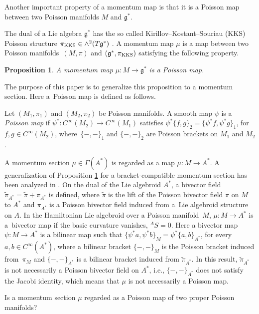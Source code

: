 \documentclass[pdftex]{sigma}
\numberwithin{equation}{section}
\newtheorem{Proposition}[Theorem]{Proposition}
 { \theoremstyle{definition}
\newtheorem{Definition}[Theorem]{Definition}
\newtheorem{Note}[Theorem]{Note}
\newtheorem{Example}[Theorem]{Example}
\newtheorem{Remark}[Theorem]{Remark}
\newtheorem{Question}[Theorem]{Question}
 }
\newcommand{\sbv}[2]{{\{{{#1},{#2}}\}}}
\newcommand{\wpi}{{\widetilde{\pi}}}
\begin{document}
Another important property of a momentum map is that it is a Poisson map
between two Poisson manifolds $M$ and $\mathfrak{g}^*$.

The dual of a Lie algebra $\mathfrak{g}^*$ has the so called
Kirillov--Kostant--Souriau (KKS) Poisson structure
$\pi_{\rm KKS} \in \wedge^2(T\mathfrak{g}^*)$ \cite{Kirillov}.
A momentum map $\mu$ is a map between two Poisson manifolds~$(M, \pi)$ and $(\mathfrak{g}^*, \pi_{\rm KKS})$ satisfying the following property.
\begin{Proposition}\label{MMPM}
A momentum map $\mu\colon M \rightarrow \mathfrak{g}^*$ is a Poisson map.
\end{Proposition}
The purpose of this paper is to generalize this proposition to a momentum section.
Here a~Poisson map is defined as follows.
\begin{Definition}
Let $(M_1, \pi_1)$ and $(M_2, \pi_2)$ be Poisson manifolds.
A smooth map $\psi$ is a \textit{Poisson map} if
$\psi^*\colon C^{\infty}(M_2) \rightarrow C^{\infty}(M_1)$ satisfies
$
\psi^* \sbv{f}{g}_2 = \sbv{\psi^* f}{\psi^* g}_1$,
for $f, g \in C^{\infty}(M_2)$, where~${\sbv{-}{-}_1}$
and $\sbv{-}{-}_2$ are Poisson brackets on $M_1$ and $M_2$.
\end{Definition}

A momentum section $\mu \in \Gamma(A^*)$ is regarded as a map $\mu\colon M \rightarrow A^*$.
A generalization of Proposition \ref{MMPM} for a bracket-compatible momentum section has been analyzed in \cite{Blohmann:2023}.
On the dual of the Lie algebroid $A^*$, a bivector field
$\wpi_{A^*} = \wpi + \pi_{A^*}$ is defined, where $\wpi$
is the lift of the Poisson bivector field $\pi$ on $M$ to $A^*$
and $\pi_{A^*}$ is a Poisson bivector field induced from a~Lie algebroid structure on $A$.
In the Hamiltonian Lie algebroid over a Poisson manifold~$M$,
${\mu\colon M \rightarrow A^*}$ is a~bivector map
if the basic curvature vanishes, ${}^A S =0$.
Here a bivector map~${\psi\colon M \rightarrow A^*}$ is a bilinear map such that
$
\sbv{\psi^* a}{\psi^* b}_M = \psi^* \sbv{a}{b}_{A^*}$,
for every $a, b \in C^{\infty}(A^*)$,
where a bilinear bracket
$\sbv{-}{-}_M$ is the Poisson bracket induced from~$\pi_M$
and $\sbv{-}{-}_{A^*}$ is a bilinear bracket induced from $\wpi_{A^*}$.
In this result, $\wpi_{A^*}$ is not necessarily a Poisson bivector field on $A^*$, i.e., $\sbv{-}{-}_{A^*}$ does not satisfy the Jacobi identity, which means that $\mu$ is not necessarily a Poisson map.

\begin{Question}
Is a momentum section $\mu$ regarded as a Poisson map of two proper Poisson manifolds?
\end{Question}
\end{document}
